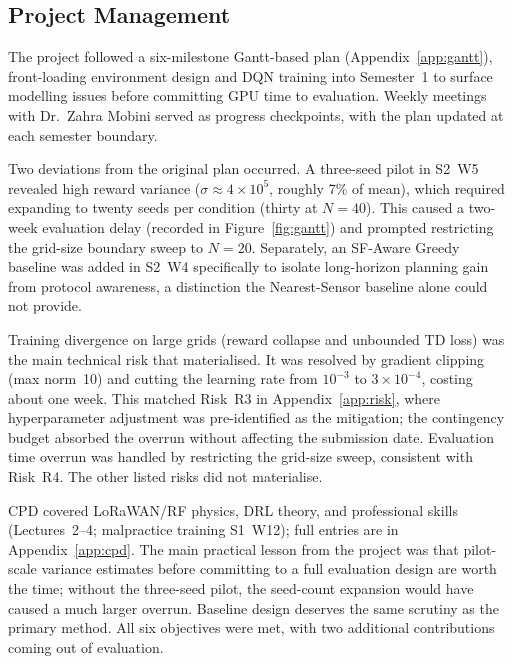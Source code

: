 \subsection{Project Management}
\label{sec:project_management}

The project followed a six-milestone Gantt-based plan (Appendix~\ref{app:gantt}), front-loading environment design and DQN training into Semester~1 to surface modelling issues before committing GPU time to evaluation. Weekly meetings with Dr.~Zahra Mobini served as progress checkpoints, with the plan updated at each semester boundary.

Two deviations from the original plan occurred. A three-seed pilot in S2~W5 revealed high reward variance ($\sigma\approx4\times10^5$, roughly 7\% of mean), which required expanding to twenty seeds per condition (thirty at $N=40$). This caused a two-week evaluation delay (recorded in Figure~\ref{fig:gantt}) and prompted restricting the grid-size boundary sweep to $N=20$. Separately, an SF-Aware Greedy baseline was added in S2~W4 specifically to isolate long-horizon planning gain from protocol awareness, a distinction the Nearest-Sensor baseline alone could not provide.

Training divergence on large grids (reward collapse and unbounded TD loss) was the main technical risk that materialised. It was resolved by gradient clipping (max norm~10) and cutting the learning rate from $10^{-3}$ to $3\times10^{-4}$, costing about one week. This matched Risk~R3 in Appendix~\ref{app:risk}, where hyperparameter adjustment was pre-identified as the mitigation; the contingency budget absorbed the overrun without affecting the submission date. Evaluation time overrun was handled by restricting the grid-size sweep, consistent with Risk~R4. The other listed risks did not materialise.

CPD covered LoRaWAN/RF physics, DRL theory, and professional skills (Lectures~2--4; malpractice training S1~W12); full entries are in Appendix~\ref{app:cpd}. The main practical lesson from the project was that pilot-scale variance estimates before committing to a full evaluation design are worth the time; without the three-seed pilot, the seed-count expansion would have caused a much larger overrun. Baseline design deserves the same scrutiny as the primary method. All six objectives were met, with two additional contributions coming out of evaluation.
